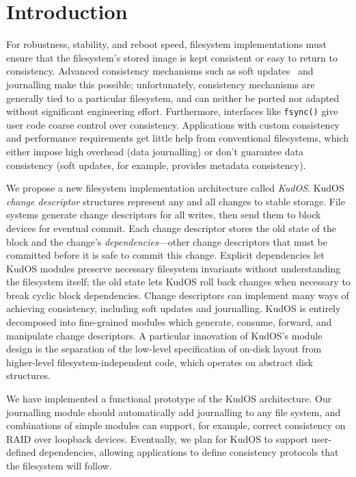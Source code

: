 
\section*{Introduction}
\label{sec:intro}

For robustness, stability, and reboot speed, filesystem implementations
must ensure that the filesystem's stored image is kept consistent
or easy to return to consistency.
%
Advanced consistency mechanisms such as soft updates~\cite{ganger00soft}
and journalling make this possible; unfortunately,
%
consistency mechanisms are generally tied to a particular filesystem, and
can neither be ported nor adapted without significant engineering
effort.
%
Furthermore, interfaces like \verb+fsync()+ give user code coarse control
over consistency.
%
Applications with custom consistency and performance requirements get
little help from conventional filesystems, which either impose high
overhead (data journalling) or don't guarantee data consistency (soft
updates, for example, provides metadata consistency).



We propose a new filesystem implementation architecture called
\emph{KudOS}.
%
KudOS \emph{change descriptor} structures represent any and all changes to
stable storage.
%
File systems generate change descriptors for all writes, then
send them to block devices for eventual commit.
%
Each change descriptor stores the old state of the block and the change's
\emph{dependencies}---other change descriptors that must be committed before
it is safe to commit this change.
%
Explicit dependencies let KudOS modules preserve necessary filesystem
invariants without understanding the filesystem itself; the old state
lets KudOS roll back changes when necessary to break cyclic block dependencies.
%
Change descriptors can implement many ways of achieving
consistency, including soft updates and journalling.
%
%
%
KudOS is entirely decomposed into fine-grained modules which generate,
consume, forward, and manipulate change descriptors.
%
A particular innovation of KudOS's module design is the separation of the
low-level specification of on-disk layout from higher-level
filesystem-independent code, which operates on abstract disk
structures.

We have implemented a functional prototype of the KudOS
architecture.
%
Our journalling module should automatically add journalling to any file
system, and combinations of simple modules can support, for example,
correct consistency on RAID over loopback devices.
%
Eventually, we plan for KudOS to support user-defined dependencies,
allowing applications to define consistency protocols that the filesystem
will follow.

%
%
